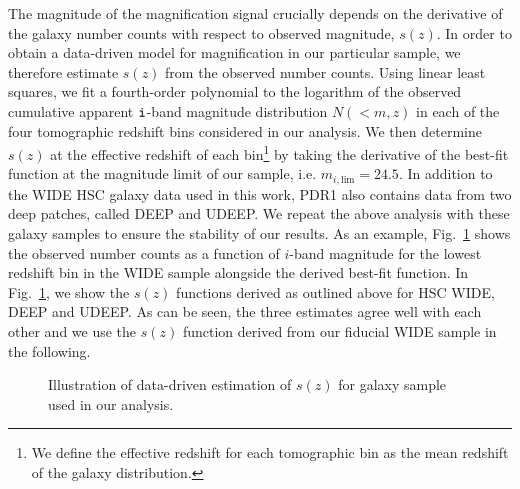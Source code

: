 \documentclass[a4paper,11pt]{article}
\begin{document}
    The magnitude of the magnification signal crucially depends on the derivative of the galaxy number counts with respect to observed magnitude, $s(z)$. In order to obtain a data-driven model for magnification in our particular sample, we therefore estimate $s(z)$ from the observed number counts. Using linear least squares, we fit a fourth-order polynomial to the logarithm of the observed cumulative apparent $\tt{i}$-band magnitude distribution $N(<m, z)$ in each of the four tomographic redshift bins considered in our analysis. We then determine $s(z)$ at the effective redshift of each bin\footnote{We define the effective redshift for each tomographic bin as the mean redshift of the galaxy distribution.} by taking the derivative of the best-fit function at the magnitude limit of our sample, i.e. $m_{i, \mathrm{lim}} = 24.5$. In addition to the WIDE HSC galaxy data used in this work, PDR1 also contains data from two deep patches, called DEEP and UDEEP. We repeat the above analysis with these galaxy samples to ensure the stability of our results. As an example, Fig.~\ref{fig:s-func-estimation} shows the observed number counts as a function of $i$-band magnitude for the lowest redshift bin in the WIDE sample alongside the derived best-fit function. In Fig.~\ref{fig:s-func-estimation}, we show the $s(z)$ functions derived as outlined above for HSC WIDE, DEEP and UDEEP. As can be seen, the three estimates agree well with each other and we use the $s(z)$ function derived from our fiducial WIDE sample in the following.
    \begin{figure}
      \begin{center}
        \caption{Illustration of data-driven estimation of $s(z)$ for galaxy sample used in our analysis.} 
        \label{fig:s-func-estimation}
      \end{center}
    \end{figure}
\end{document}
